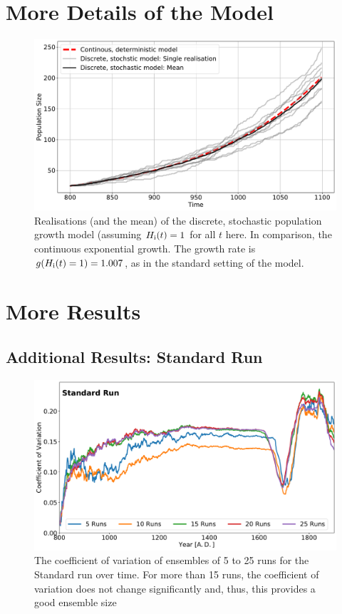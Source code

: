
\chapter{More Details of the Model} \label{sec:APPpopgrowth}
\FloatBarrier
\begin{figure}[h]
	\centering
	\includegraphics[width=\textwidth]{images/RealisationsOfPopGrowth.pdf}
	\caption{Realisations (and the mean) of the discrete, stochastic population growth model (assuming $H_{\rm i}(t) = 1$ for all $t$ here. In comparison, the continuous exponential growth. The growth rate is $g(H_{\rm i}(t)=1)=1.007$, as in the standard setting of the model.}
	\label{fig:realisationsofpopgrowth}
\end{figure}


\chapter{More Results}
\FloatBarrier
\section{Additional Results: Standard Run}

\begin{figure}[h]
	\centering
	\includegraphics[width=\textwidth]{images/Results/Standard/CoeffOfVariation}
	\caption{The coefficient of variation of ensembles of 5 to 25 runs for the Standard run over time. For more than 15 runs, the coefficient of variation does not change significantly and, thus, this provides a good ensemble size}
	\label{fig:coeffofvariation}
\end{figure}


